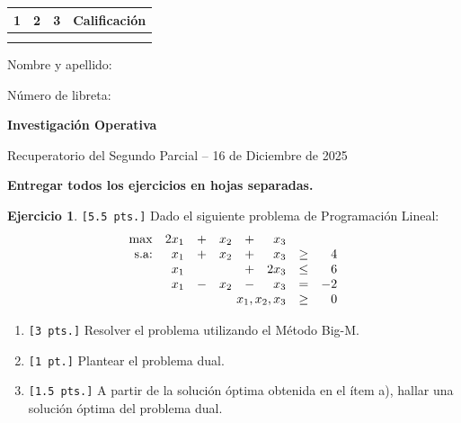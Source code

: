 \documentclass[a4paper,oneside,12pt]{amsart}
\newcommand{\nombremateria}
{Investigaci\'on Operativa}
\newcommand{\numeroparcial}
    { Recuperatorio del Segundo Parcial }
\newcommand{\fecha}
    {16 de Diciembre de 2025}
\theoremstyle{definition}
\newtheorem{quest}{Ejercicio}
\begin{document}
\hfill \hfill
\begin{tabular}[c]{|c|c|c|c|}
\hline 
1 & 2 & 3 & Calificaci\'on \\ \hline \hline
\hspace{1.2 cm} & \hspace{1.2 cm} & \hspace{1.2 cm} &\hspace{1.5 cm} \\
\hspace{1.2 cm} & \hspace{1.2 cm} & \hspace{1.2 cm} &\hspace{1.5 cm} \\ \hline

\end{tabular}

\vspace{-1cm}

\noindent Nombre y apellido:


\noindent Número de libreta:

\noindent \hrulefill 

\renewcommand{\baselinestretch}{1.1}

\begin{center}
	\large \textbf{\nombremateria} 
	
	\numeroparcial -- \fecha
\end{center}

\renewcommand{\theenumi}{\textbf{\arabic{enumi}}}

\begin{center}
    \textbf{Entregar todos los ejercicios en hojas separadas.}
\end{center}

\begin{quest} 
\verb|[5.5 pts.]| Dado el siguiente problema de Programación Lineal:
    \[
        \begin{array}{rrcrcrcr}
            \max & 2x_1 & + & x_2 & + & x_3 & & \\
            \text{s.a:} & x_1 & + & x_2 & + & x_3 & \geq & 4\\
            & x_1 &  &    & + & 2x_3 & \leq & 6 \\
            & x_1 & - & x_2 & - & x_3 & = & -2\\
            & \multicolumn{5}{r}{x_1,x_2,x_3} & \geq & 0 \\
        \end{array}
    \]
    \begin{enumerate}[label=\alph*)]
        \item \verb|[3 pts.]| Resolver el problema utilizando el Método Big-M.
        \item \verb|[1 pt.]| Plantear el problema dual.
        \item \verb|[1.5 pts.]| A partir de la solución óptima obtenida en el ítem a), hallar una solución
        óptima del problema dual.
    \end{enumerate}

\end{quest}
\end{document}
